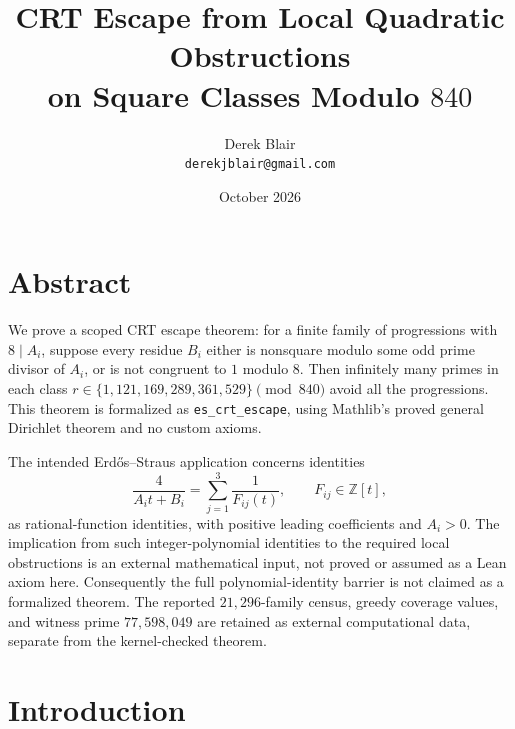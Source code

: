 \documentclass[11pt,a4paper]{article}
\title{CRT Escape from Local Quadratic Obstructions\\
  on Square Classes Modulo $840$}
\author{Derek Blair \\ \texttt{derekjblair@gmail.com}}
\date{October 2026}
\theoremstyle{definition}
\begin{document}
\maketitle

\section{Abstract}

We prove a scoped CRT escape theorem: for a finite family of
progressions with $8\mid A_i$, suppose every residue $B_i$ either is
nonsquare modulo some odd prime divisor of $A_i$, or is not congruent
to $1$ modulo $8$. Then infinitely many primes in each class
$r\in\{1,121,169,289,361,529\}\pmod{840}$ avoid all the progressions.
This theorem is formalized as \texttt{es\_crt\_escape}, using Mathlib's
proved general Dirichlet theorem and no custom axioms.

The intended Erd\H{o}s--Straus application concerns identities
\begin{equation}
  \label{eq:identityform}
  \frac{4}{A_it+B_i} = \sum_{j=1}^{3}\frac{1}{F_{ij}(t)},
  \qquad F_{ij} \in \mathbb{Z}[t],
\end{equation}
as rational-function identities, with positive leading coefficients and
$A_i>0$. The implication from such
integer-polynomial identities to the required local obstructions is
an external mathematical input, not proved or assumed as a Lean axiom
here. Consequently the full polynomial-identity barrier is not claimed
as a formalized theorem. The reported $21{,}296$-family census, greedy
coverage values, and witness prime $77{,}598{,}049$ are retained as
external computational data, separate from the kernel-checked theorem.

\section{Introduction}
\end{document}
